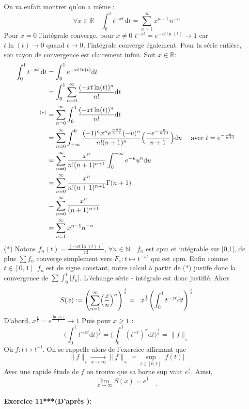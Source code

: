 \documentclass[letterpaper,10pt]{article}
\begin{document}
On va enfait montrer qu'on a même : \[\ \forall x \in \mathbb{R} \quad \int_0^1 t^{-xt}\,\mathrm{d}t = \sum_{n=1}^\infty x^{n-1}n^{-n} \]
Pour $x=0 $ l'intégrale converge, pour $x\neq0$  $t^{-xt} = e^{-xt\ln(t)} \to 1 $ car $t\ln(t) \to 0$ quand $t \to 0$, l'intégrale converge également. Pour la série entière, son rayon de convergence est clairement infini.
Soit  $x \in \mathbb{R}$:
\begin{align*} \int_0^1 t^{-xt}\,\mathrm{d}t  &= \int_0^1 e^{-xt\ln(t)} \mathrm{d}t \\ & = \int_0^1\sum_{n=0}^{\infty}\frac{(-xt\ln(t))^n}{n!} \mathrm{d}t  \\  ^{(*)} &= \sum_{n=0}^{\infty}\int_0^1\frac{(-xt\ln(t))^n}{n!} \mathrm{d}t  \\ & = \sum_{n=0}^{\infty}\int_{+\infty}^0\frac{(-1)^nx^ne^{\frac{-un}{n+1}}(-u)^n}{n!(n+1)^n} \Bigl(\frac{-e^{-\frac{u}{n+1}}}{n+1}\Bigr)\mathrm{d}u \quad \text{ avec } t=e^{-\frac{u}{n+1}} 
\\ & = 
\sum_{n=0}^{\infty}\frac{x^n}{n!(n+1)^{n+1}}\int_0^{+\infty} e^{-u}u^n\mathrm{d}u 
\\ & = 
\sum_{n=0}^{\infty}\frac{x^n}{n!(n+1)^{n+1}}\Gamma(n+1)
\\ & = \sum_{n=0}^{\infty}\frac{x^n}{(n+1)^{n+1}}
\\ & = \sum_{n=1}^{\infty}x^{n-1}n^{-n}
\end{align*}
(*) Notons $f_n(t) = \frac{(-xt\ln(t))^n}{n!}$, $\forall n \in \mathbb{N} \quad f_n$ est cpm et intégrable sur [0,1], de plus $\sum f_n$ converge simplement vers $F_x:t\mapsto t^{-xt}$ qui est cpm. Enfin comme $t \in [0,1] \;\; f_n$ est de signe constant, notre calcul à partir de (*) justife donc la convergence de $\sum\int_0^1|f_n|$. L'échange série - intégrale est donc justifié.
Alors \[\ S(x) := \Biggl( \sum_{n=1}^{\infty} \Bigl(\frac{x}{n}\Bigr)^n\Biggr)^{\frac{1}{x}} = \;\; x^{\frac{1}{x}}\Biggl(\int_0^1 t^{-xt} \mathrm{d}t\Biggr)^{\frac{1}{x}} \] D'abord, $x^{\frac{1}{x}} = e^{\frac{\ln(x)}{x}} \to 1$ Puis pour $x \geq 1$ : \[\ \Biggl(\int_0^1 t^{-xt} \mathrm{d}t\Biggr)^{\frac{1}{x}}  = \Biggl(\int_0^1 (t^{-t})^x \mathrm{d}t\Biggr)^{\frac{1}{x}} = \|f\|_{_x} \] Où $f: t \mapsto t^{-t}$. On se rappelle alors de l'exercice affirmant que \[\ \|f\|_{_x} \xrightarrow[x \to \infty]{} \|f\|_{_\infty} = \sup_{t\in [0,1]}|f(t)| \] Avec une rapide étude de $f$ on trouve que sa borne sup vaut $e^{\frac{1}{e}}$. Ainsi, \[\ \lim_{x \to \infty}S(x) = e^{\frac{1}{e}}\quad _{_\square} \] 


\paragraph{Exercice 11***(D'après \cite{igor}):}
\end{document}
